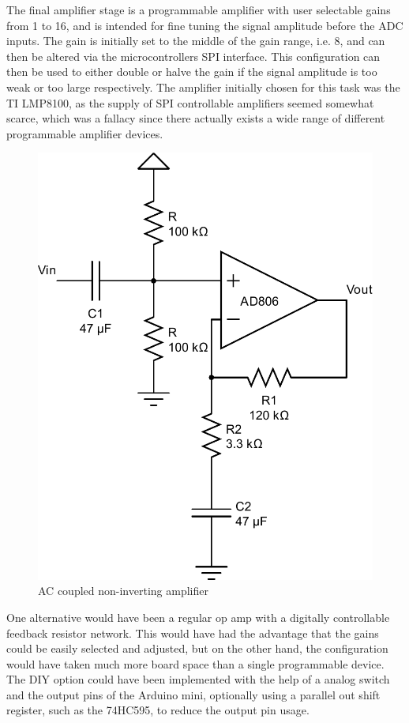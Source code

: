 \documentclass[a4paper,11pt]{article}
\begin{document}
The final amplifier stage is a programmable amplifier with user
selectable gains from 1 to 16, and is intended for fine tuning the
signal amplitude before the ADC inputs. The gain is initially set to
the middle of the gain range, i.e. 8, and can then be altered via the
microcontrollers SPI interface. This configuration can then be used to
either double or halve the gain if the signal amplitude is too weak or
too large respectively. The amplifier initially chosen for this task
was the TI LMP8100, as the supply of SPI controllable amplifiers
seemed somewhat scarce, which was a fallacy since there actually
exists a wide range of different programmable amplifier devices. 
\begin{figure}[htb]   
  \caption{AC coupled non-inverting amplifier}
  \label{fig:ac-coupled-non-inverting}
  \includegraphics[width=0.7\linewidth]{ac-coupled-non-inverting}
\end{figure}
One alternative would have been a regular op amp with a digitally
controllable feedback resistor network. This would have had the
advantage that the gains could be easily selected and adjusted, but on
the other hand, the configuration would have taken much more board
space than a single programmable device. The DIY option could have
been implemented with the help of a analog switch and the output pins
of the Arduino mini, optionally using a parallel out shift register,
such as the 74HC595, to reduce the output pin usage.
\end{document}
